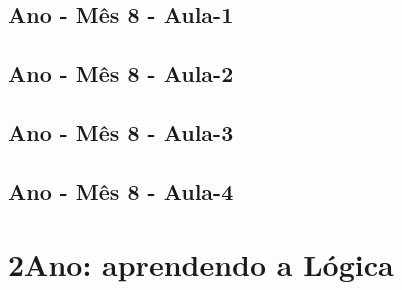 \begin{multicols}{2}
\section[\sffamily 1\textordmasculine\space Ano - M\^{e}s 8 - Aula-1]{\textordmasculine\space Ano - M\^{e}s 8 - Aula-1}


\section[\sffamily 1\textordmasculine\space Ano - M\^{e}s 8 - Aula-2]{\textordmasculine\space Ano - M\^{e}s 8 - Aula-2}


\section[\sffamily 1\textordmasculine\space Ano - M\^{e}s 8 - Aula-3]{\textordmasculine\space Ano - M\^{e}s 8 - Aula-3}


\section[\sffamily 1\textordmasculine\space Ano - M\^{e}s 8 - Aula-4]{\textordmasculine\space Ano - M\^{e}s 8 - Aula-4}

\end{multicols}

\color{white}

	\chapter[2\textordmasculine\space Ano: aprendendo a L\'{o}gica]{2\textordmasculine\space Ano: aprendendo a L\'{o}gica}\label{chap4}
	
\pagebreak

\ClearWallPaper

\color{black}



